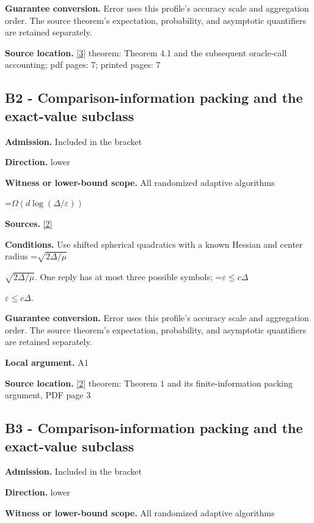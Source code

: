 \documentclass[10pt,a4paper]{article}
\newcommand{\AtlasMath}[1]{\par\begingroup\centering\setbox0=\hbox{$\displaystyle #1$}\ifdim\wd0>1.4\linewidth\typeout{ATLAS WIDE FORMULA: \the\wd0}\fi\ifdim\wd0>\linewidth\resizebox{\linewidth}{!}{\box0}\else\box0\fi\par\endgroup}
\newcommand{\AtlasInlineMath}[1]{\begingroup\setbox0=\hbox{$#1$}\ifdim\wd0>.4\linewidth\endgroup\AtlasMath{#1}\else\endgroup$#1$\fi}
\begin{document}
\textbf{Guarantee conversion.} Error uses this profile's accuracy scale and aggregation order. The source theorem's expectation, probability, and asymptotic quantifiers are retained separately.

\textbf{Source location.} \href{https://proceedings.neurips.cc/paper_files/paper/2024/file/26289c647c6828e862e271ca3c490486-Paper-Conference.pdf}{[3]} theorem: Theorem 4.1 and the subsequent oracle-call accounting; pdf pages: 7; printed pages: 7

\subsection{B2 - Comparison-information packing and the exact-value subclass}
\textbf{Admission.} Included in the bracket

\textbf{Direction.} lower

\textbf{Witness or lower-bound scope.} All randomized adaptive algorithms

\AtlasMath{\Omega\!\left(d\log(\Delta/\varepsilon)\right)}
\textbf{Sources.} \href{https://papers.nips.cc/paper_files/paper/2012/file/e6d8545daa42d5ced125a4bf747b3688-Paper.pdf}{[2]}

\textbf{Conditions.} Use shifted spherical quadratics with a known Hessian and center radius \AtlasInlineMath{\sqrt{2\Delta/\mu}}. One reply has at most three possible symbols; \AtlasInlineMath{\varepsilon\le c\Delta}.

\textbf{Guarantee conversion.} Error uses this profile's accuracy scale and aggregation order. The source theorem's expectation, probability, and asymptotic quantifiers are retained separately.

\textbf{Local argument.} A1

\textbf{Source location.} \href{https://papers.nips.cc/paper_files/paper/2012/file/e6d8545daa42d5ced125a4bf747b3688-Paper.pdf}{[2]} theorem: Theorem 1 and its finite-information packing argument, PDF page 3

\subsection{B3 - Comparison-information packing and the exact-value subclass}
\textbf{Admission.} Included in the bracket

\textbf{Direction.} lower

\textbf{Witness or lower-bound scope.} All randomized adaptive algorithms
\end{document}
